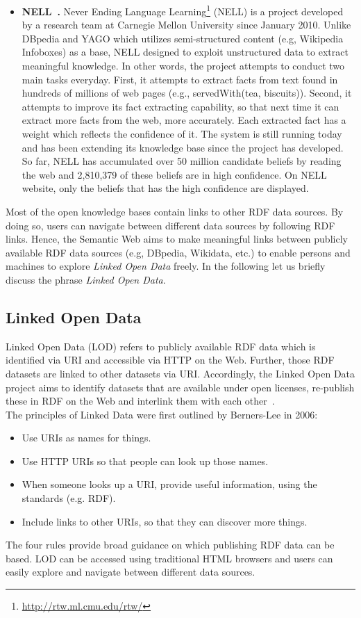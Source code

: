 \begin{itemize}
\item \textbf{NELL~\cite{DBLP:conf/wsdm/CarlsonBWHM10}.} Never Ending Language Learning\footnote{\url{http://rtw.ml.cmu.edu/rtw/}} (NELL) is a project developed by a research team at Carnegie Mellon University since January 2010. Unlike DBpedia and YAGO which utilizes semi-structured content (e.g, Wikipedia Infoboxes)  as a base, NELL designed to exploit unstructured data to extract meaningful knowledge. In other words, the project attempts to conduct two main tasks everyday.
First, it attempts to extract facts from text found in hundreds of millions of web pages (e.g., servedWith(tea, biscuits)).
Second, it attempts to improve its fact extracting capability, so that next time it can extract more facts from the web, more accurately. Each extracted fact has a weight which reflects the confidence of it. The system is still running today and has been extending its knowledge base since the project has developed. So far, NELL has accumulated over 50 million candidate beliefs by reading the web and 2,810,379 of these beliefs are in high confidence. On NELL website, only the beliefs that has the high confidence are displayed. 
\end{itemize}\vspace{0.5cm}
\noindent Most of the open knowledge bases contain links to other RDF data sources. By doing so, users can navigate between
different data sources by following RDF links. Hence, the Semantic Web aims to make meaningful links between publicly available RDF data sources (e.g, DBpedia, Wikidata, etc.) to enable persons and machines to explore \textit{Linked Open Data} freely. In the following let us  briefly discuss the phrase \textit{Linked Open Data}.\\

\subsection{Linked Open Data}
Linked Open Data (LOD) refers to publicly available RDF data which is identified via URI and accessible via HTTP on the Web. Further, those RDF datasets are linked to other datasets via URI. Accordingly, the Linked Open Data project aims to identify datasets that are available under open licenses, re-publish
these in RDF on the Web and interlink them with each other~\cite{DBLP:conf/www/BizerHIB08}. \\
The principles of Linked Data were first outlined by Berners-Lee in 2006:
\begin{itemize}
\item Use URIs as names for things.
\item Use HTTP URIs so that people can look up those names.
\item When someone looks up a URI, provide useful information, using the standards (e.g. RDF).
\item Include links to other URIs, so that they can discover more
things.
\end{itemize}
The four rules provide broad guidance on which publishing RDF data can be based. LOD can be accessed using traditional HTML
browsers and users can easily explore and navigate between different data sources.

